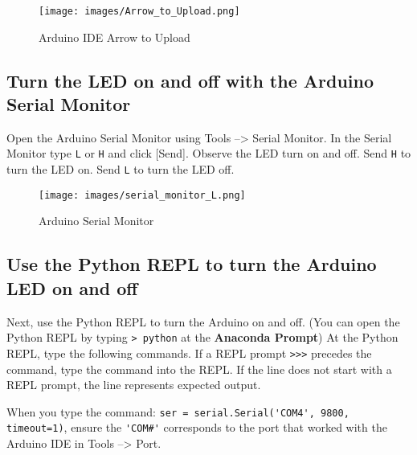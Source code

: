 \documentclass{book}
\makeatletter
\def\maxwidth{\ifdim\Gin@nat@width>\linewidth\linewidth
\else\Gin@nat@width\fi}
\let\Oldincludegraphics\includegraphics
\renewcommand{\includegraphics}[1]{\Oldincludegraphics[width=.8\maxwidth]{#1}}
\newcommand{\passthrough}[1]{#1}
\makeatother
\begin{document}
\begin{figure}
\centering
\texttt{[image: images/Arrow\_to\_Upload.png]}
\caption{Arduino IDE Arrow to Upload}
\end{figure}
    




    
        \hypertarget{turn-the-led-on-and-off-with-the-arduino-serial-monitor}{%
\subsection{Turn the LED on and off with the Arduino Serial
Monitor}\label{turn-the-led-on-and-off-with-the-arduino-serial-monitor}}
    




    
        Open the Arduino Serial Monitor using Tools --\textgreater{} Serial
Monitor. In the Serial Monitor type \passthrough{\lstinline!L!} or
\passthrough{\lstinline!H!} and click {[}Send{]}. Observe the LED turn
on and off. Send \passthrough{\lstinline!H!} to turn the LED on. Send
\passthrough{\lstinline!L!} to turn the LED off.

\begin{figure}
\centering
\texttt{[image: images/serial\_monitor\_L.png]}
\caption{Arduino Serial Monitor}
\end{figure}
    




    
        \hypertarget{use-the-python-repl-to-turn-the-arduino-led-on-and-off}{%
\subsection{Use the Python REPL to turn the Arduino LED on and
off}\label{use-the-python-repl-to-turn-the-arduino-led-on-and-off}}
    




    
        Next, use the Python REPL to turn the Arduino on and off. (You can open
the Python REPL by typing \passthrough{\lstinline!> python!} at the
\textbf{Anaconda Prompt}) At the Python REPL, type the following
commands. If a REPL prompt \passthrough{\lstinline!>>>!} precedes the
command, type the command into the REPL. If the line does not start with
a REPL prompt, the line represents expected output.

When you type the command:
\passthrough{\lstinline!ser = serial.Serial('COM4', 9800, timeout=1)!},
ensure the \passthrough{\lstinline!'COM#'!} corresponds to the port that
worked with the Arduino IDE in Tools --\textgreater{} Port.
\end{document}
